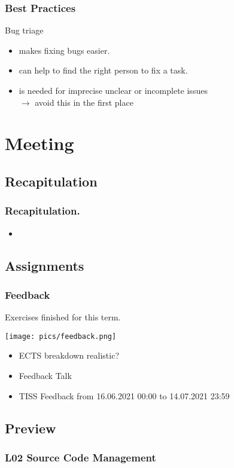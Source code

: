 \begin{frame}
	\frametitle{Best Practices}

	Bug triage
	\begin{itemize}
		\item makes fixing bugs easier.
		\item can help to find the right person to fix a task.
		\item is needed for imprecise unclear or incomplete issues \\
			$\rightarrow$ avoid this in the first place
	\end{itemize}
\end{frame}

\section{Meeting}

\subsection{Recapitulation}

\begin{frame}
	\frametitle{Recapitulation.}
	\begin{itemize}
		\item 
	\end{itemize}
\end{frame}

\subsection{Assignments}

\begin{frame}
	\frametitle{Feedback}
	Exercises finished for this term.

	\hfill \texttt{[image: pics/feedback.png]}
	\vspace{-1cm}
	\begin{itemize}
		\item ECTS breakdown realistic?
		\item Feedback Talk
		\item TISS Feedback from 16.06.2021 00:00 to 14.07.2021 23:59
	\end{itemize}
\end{frame}

\subsection{Preview}

\begin{frame}
	\frametitle{L02 Source Code Management}
\end{frame}



\nocite{raab2017introducing}

\appendix

\begin{frame}[allowframebreaks]
	
	
\end{frame}




